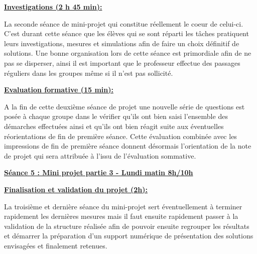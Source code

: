 \documentclass[12pt]{article}
\begin{document}
\vspace{20pt}
\begin{adjustwidth}{6.5em}{0pt}
\color{blue}
\textbf{\underline{Investigations (2 h 45 min):}}\par
\vspace{10pt}
\color{black}
La seconde séance de mini-projet qui constitue réellement le coeur de celui-ci. C'est durant cette séance que les élèves qui se sont réparti les tâches pratiquent leurs investigations, mesures et simulations afin de faire un choix définitif de solutions. Une bonne organisation lors de cette séance est primordiale afin de ne pas se disperser, ainsi il est important que le professeur effectue des passages réguliers dans les groupes même si il n'est pas sollicité. \par
\vspace{15pt}

\color{blue}
\hspace{-20pt}\textbf{\underline{Evaluation formative (15 min):}}\par
\vspace{10pt}
\color{black}
A la fin de cette deuxième séance de projet une nouvelle série de questions est posée à chaque groupe dans le vérifier qu'ils ont bien saisi l'ensemble des démarches effectuées ainsi et qu'ils ont bien réagit suite aux éventuelles réorientations de fin de première séance. Cette évaluation combinée avec les impressions de fin de première séance donnent désormais l'orientation de la note de projet qui sera attribuée à l'issu de l'évaluation sommative. 
\end{adjustwidth}

\vspace{20pt}

\color{red}
\textbf{\underline{Séance 5 : Mini projet partie 3 - Lundi matin 8h/10h}}\par
\vspace{10pt}
\color{black}


\vspace{20pt}
\begin{adjustwidth}{6.5em}{0pt}
\color{blue}
\textbf{\underline{Finalisation et validation du projet (2h):}}\par
\vspace{10pt}
\color{black}
La troisième et dernière séance du mini-projet sert éventuellement à terminer rapidement les dernières mesures mais il faut ensuite rapidement passer à la validation de la structure réalisée afin de pouvoir ensuite regrouper les résultats et démarrer la préparation d'un support numérique de présentation des solutions envisagées et finalement retenues. \par
 
\end{adjustwidth}
\end{document}
